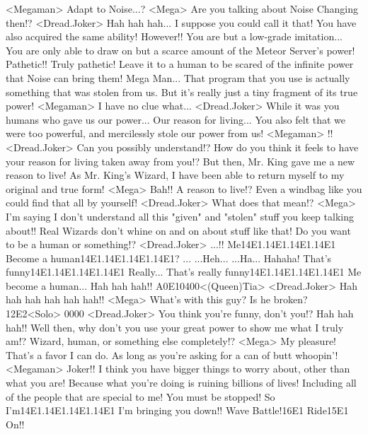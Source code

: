 <Megaman> Adapt to Noise...? 
<Mega> Are you talking about Noise Changing then!? 
<Dread.Joker> Hah hah hah... 
I suppose you could call it that! You have also acquired the same ability! 
However!! 
You are but a low-grade imitation... 
You are only able to draw on but a scarce amount of the Meteor Server's power! 
Pathetic!! Truly pathetic! 
Leave it to a human to be scared of the infinite power that Noise can bring them! 
Mega Man... 
That program that you use is actually something that was stolen from us. 
But it's really just a tiny fragment of its true power! 
<Megaman> I have no clue what... 
<Dread.Joker> While it was you humans who gave us our power... 
Our reason for living... 
You also felt that we were too powerful, and mercilessly stole our power from us! 
<Megaman> !! 
<Dread.Joker> Can you possibly understand!? 
How do you think it feels to have your reason for living taken away from you!? 
But then, Mr. King gave me a new reason to live! 
As Mr. King's Wizard, I have been able to return myself to my original and true form! 
<Mega> Bah!! A reason to live!? 
Even a windbag like you could find that all by yourself! 
<Dread.Joker> What does that mean!? 
<Mega> I'm saying I don't understand all this "given" and "stolen" stuff you keep talking about!! 
Real Wizards don't whine on and on about stuff like that! 
Do you want to be a human or something!? 
<Dread.Joker> ...!! 
Me{14}{E1}.{14}{E1}.{14}{E1}.{14}{E1} Become a human{14}{E1}.{14}{E1}.{14}{E1}.{14}{E1}? 
... 
...Heh... 
...Ha... 
Hahaha! 
That's funny{14}{E1}.{14}{E1}.{14}{E1}.{14}{E1} Really... That's really funny{14}{E1}.{14}{E1}.{14}{E1}.{14}{E1} 
Me become a human... 
Hah hah hah!! 
{A0}{E1}{04}{00}<(Queen)Tia> 
<Dread.Joker> Hah hah hah hah hah hah!! 
<Mega> What's with this guy? Is he broken? 
{12}{E2}<Solo> {00}{00} 
<Dread.Joker> You think you're funny, don't you!? Hah hah hah!! 
Well then, why don't you use your great power to show me what I truly am!? 
Wizard, human, or something else completely!? 
<Mega> My pleasure! That's a favor I can do. 
As long as you're asking for a can of butt whoopin'! 
<Megaman> Joker!! 
I think you have bigger things to worry about, other than what you are! 
Because what you're doing is ruining billions of lives! 
Including all of the people that are special to me! 
You must be stopped! 
So I'm{14}{E1}.{14}{E1}.{14}{E1}.{14}{E1} I'm bringing you down!! 
Wave Battle!{16}{E1} Ride{15}{E1} On!! 
